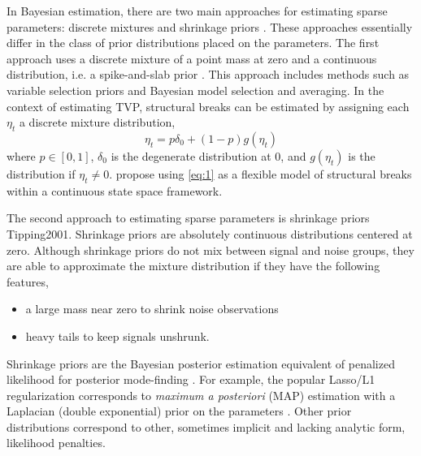 \documentclass{article}
\begin{document}
In Bayesian estimation, there are two main approaches for estimating sparse parameters: discrete mixtures and shrinkage priors \parencite[73]{CarvalhoPolsonScott2009}.
These approaches essentially differ in the class of prior distributions placed on the parameters.
The first approach uses a discrete mixture of a point mass at zero and a continuous distribution, i.e. a spike-and-slab prior \parencite{GeorgeMcCulloch1993}.
This approach includes methods such as variable selection priors and Bayesian model selection and averaging.
In the context of estimating TVP, structural breaks can be estimated by assigning each $\eta_{t}$ a discrete mixture distribution,
\begin{equation}
  \label{eq:1}
  \eta_{t} = p \delta_{0} +  (1 - p) g(\eta_{t})
\end{equation}
where $p \in [0, 1]$, $\delta_{0}$ is the degenerate distribution at 0, and $g(\eta_{t})$ is the distribution if $\eta_{t} \neq 0$.
\textcite{GiordaniKohn2008} propose using \eqref{eq:1} as a flexible model of structural breaks within a continuous state space framework.

The second approach to estimating sparse parameters is shrinkage priors \textcite{Tibshirani1996}{Tipping2001}.
Shrinkage priors are absolutely continuous distributions centered at zero.
Although shrinkage priors do not mix between signal and noise groups, they are able to approximate the mixture distribution if they have the following features,
\begin{itemize}
\item a large mass near zero to shrink noise observations
\item heavy tails to keep signals unshrunk.
\end{itemize}
Shrinkage priors are the Bayesian posterior estimation equivalent of penalized likelihood for posterior mode-finding \parencites{PolsonScott2010}{PolsonScott2012a}.
For example, the popular Lasso/L1 regularization \parencite{Tibshirani1996} corresponds to \textit{maximum a posteriori} (MAP) estimation with a Laplacian (double exponential) prior on the parameters \parencites{ParkCasella2008}{Hans2009}.
Other prior distributions correspond to other, sometimes implicit and lacking analytic form, likelihood penalties.
\end{document}
